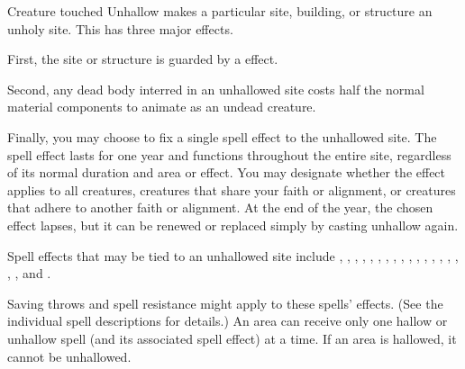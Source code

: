 \begin{spelltarget}{Creature touched}
\spelleffect Unhallow makes a particular site, building, or structure an unholy site. This has three major effects.
\par First, the site or structure is guarded by a  effect.
\par Second, any dead body interred in an unhallowed site costs half the normal material components to animate as an undead creature.
\par Finally, you may choose to fix a single spell effect to the unhallowed site. The spell effect lasts for one year and functions throughout the entire site, regardless of its normal duration and area or effect. You may designate whether the effect applies to all creatures, creatures that share your faith or alignment, or creatures that adhere to another faith or alignment. At the end of the year, the chosen effect lapses, but it can be renewed or replaced simply by casting unhallow again.
\par Spell effects that may be tied to an unhallowed site include , , , , , , , , , , , , , , , , , , and .
\par Saving throws and spell resistance might apply to these spells' effects. (See the individual spell descriptions for details.)
\spellnotes An area can receive only one hallow or unhallow spell (and its associated spell effect) at a time. If an area is hallowed, it cannot be unhallowed.


\end{spelltarget}
